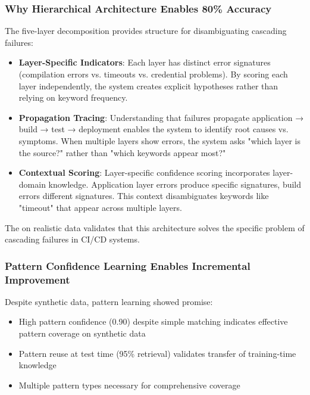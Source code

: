 \documentclass[11pt]{article}
\begin{document}
\subsubsection{Why Hierarchical Architecture Enables 80\% Accuracy}

The five-layer decomposition provides structure for disambiguating cascading failures:

\begin{itemize}
    \item \textbf{Layer-Specific Indicators}: Each layer has distinct error signatures (compilation errors vs. timeouts vs. credential problems). By scoring each layer independently, the system creates explicit hypotheses rather than relying on keyword frequency.

    \item \textbf{Propagation Tracing}: Understanding that failures propagate application → build → test → deployment enables the system to identify root causes vs. symptoms. When multiple layers show errors, the system asks "which layer is the source?" rather than "which keywords appear most?"

    \item \textbf{Contextual Scoring}: Layer-specific confidence scoring incorporates layer-domain knowledge. Application layer errors produce specific signatures, build errors different signatures. This context disambiguates keywords like "timeout" that appear across multiple layers.
\end{itemize}

The on realistic data validates that this architecture solves the specific problem of cascading failures in CI/CD systems.

\subsubsection{Pattern Confidence Learning Enables Incremental Improvement}

Despite synthetic data, pattern learning showed promise:

\begin{itemize}
    \item High pattern confidence (0.90) despite simple matching indicates effective pattern coverage on synthetic data
    \item Pattern reuse at test time (95\% retrieval) validates transfer of training-time knowledge
    \item Multiple pattern types necessary for comprehensive coverage
\end{itemize}
\end{document}
